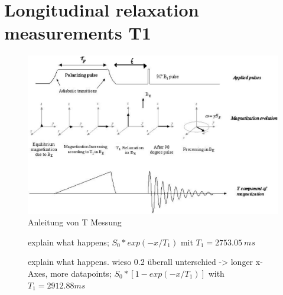 \section{Longitudinal relaxation measurements T1}
\label{sec:LongitudinalrelaxationmeasurementsT1}



\begin{figure}[H]
    \centering
    \includegraphics[width= \textwidth]{BildT1.png}   
    \caption[]{Anleitung von T Messung \cite{Bild}}
    \label{fig:BildT1}
\end{figure}

\begin{figure}[H]
    \centering
    
    \caption[]{explain what happens; $S_0 * exp(-x/T_1)$ mit $T_1=\SI{2753.05}{ms}$}
    \label{fig:T1Erdmagnetfeld}
\end{figure}

\begin{figure}[H]
    \centering
    
    \caption[]{explain what happens. wieso 0.2 überall unterschied -> longer x-Axes, more datapoints; $S_0 *[1-exp(-x/T_1)]$ with $T_1=\si{2912.88}{ms}$}
    \label{fig:T1Polarisationsfeldfeld}
\end{figure}

